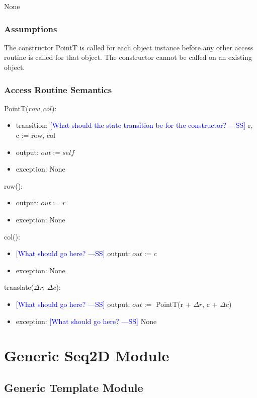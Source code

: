 \documentclass[12pt]{article}
\newcommand{\authornote}[3]{\textcolor{#1}{[#3 ---#2]}}
\newcommand{\authornote}[3]{}
\newcommand{\wss}[1]{\authornote{blue}{SS}{#1}}
\begin{document}
None

\subsubsection* {Assumptions}

The constructor PointT is called for each object instance before any other
access routine is called for that object.  The constructor cannot be called on
an existing object.

\subsubsection* {Access Routine Semantics}

PointT($row, col$):
\begin{itemize}
\item transition: \wss{What should the state transition be for the constructor?} r, c := row, col
\item output: $out := \mathit{self}$
\item exception: None
\end{itemize}

\noindent row():
\begin{itemize}
\item output: $out := r$
\item exception: None
\end{itemize}

\noindent col():
\begin{itemize}
\item \wss{What should go here?} output: $out := c$
\item exception: None
\end{itemize}

\noindent translate($\Delta r$, $\Delta c$):
\begin{itemize}
\item \wss{What should go here?} output: $out :=$ PointT(r + $\Delta r$, c + $\Delta c$)
\item exception: \wss{What should go here?} None
\end{itemize}

\newpage

\section* {Generic Seq2D Module}

\subsection* {Generic Template Module}
\end{document}
